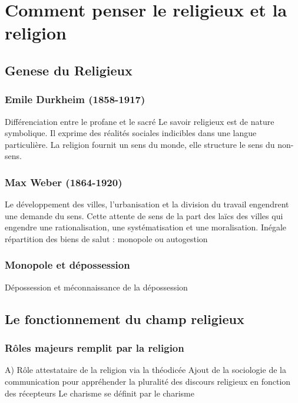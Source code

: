 \chapter{Comment penser le religieux et la religion}



 \section{Genese du Religieux}

 \subsection{Emile Durkheim (1858-1917) }
 
 Différenciation entre le profane et le sacré  Le savoir religieux est de nature symbolique. Il exprime des réalités sociales indicibles dans une langue particulière.  La religion fournit un sens du monde, elle structure le sens du non-sens.  

 \subsection{Max Weber (1864-1920) }

 Le développement des villes, l’urbanisation et la division du travail engendrent une demande du sens.  Cette attente de sens de la part des laïcs des villes qui engendre une rationalisation, une systématisation et une moralisation. Inégale répartition des biens de salut : monopole ou autogestion

 \subsection{Monopole et dépossession }

 Dépossession et méconnaissance de la dépossession

 \section{Le fonctionnement du champ religieux}


\subsection{ Rôles majeurs remplit par la religion}
      A) Rôle attestataire de la religion via la théodicée Ajout de la sociologie de la communication pour appréhender la pluralité des discours religieux en fonction des récepteurs Le charisme se définit par le charisme   
      
